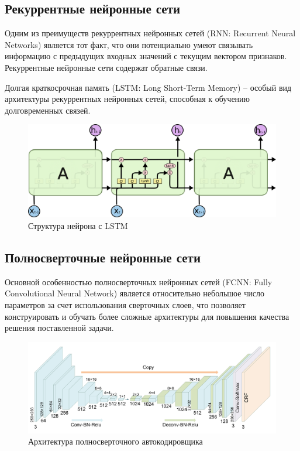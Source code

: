\documentclass[12pt]{article}
\begin{document}
    \subsection{Рекуррентные нейронные сети}
    \label{sec:Future:LSTM}

    \par Одним из преимуществ рекуррентных нейронных сетей (RNN: Recurrent Neural Networks) является тот факт, что они потенциально умеют связывать информацию с предыдущих входных значений с текущим вектором признаков. Рекуррентные нейронные сети содержат обратные связи.

    \par Долгая краткосрочная память (LSTM: Long Short-Term Memory) \cite{LSTM} – особый вид архитектуры рекуррентных нейронных сетей, способная к обучению долговременных связей.

    \begin{figure}[h!]
        \centering
        \includegraphics[width=0.9\linewidth]{LSTM.png}
        \caption{Структура нейрона с LSTM}
        \label{sec:Future:LSTM:fig:LSTM}
    \end{figure}


    \subsection{Полносверточные нейронные сети}
    \label{sec:Future:FCNN}

    \par Основной особенностью полносверточных нейронных сетей (FCNN: Fully Convolutional Neural Network) является относительно небольшое число параметров за счет использования сверточных слоев, что позволяет конструировать и обучать более сложные архитектуры для повышения качества решения поставленной задачи.

    \begin{figure}[h!]
        \centering
        \includegraphics[width=0.9\linewidth]{FCNN.png}
        \caption{Архитектура полносверточного автокодировщика}
        \label{sec:Future:FCNN:fig:FCNN}
    \end{figure}
\end{document}
